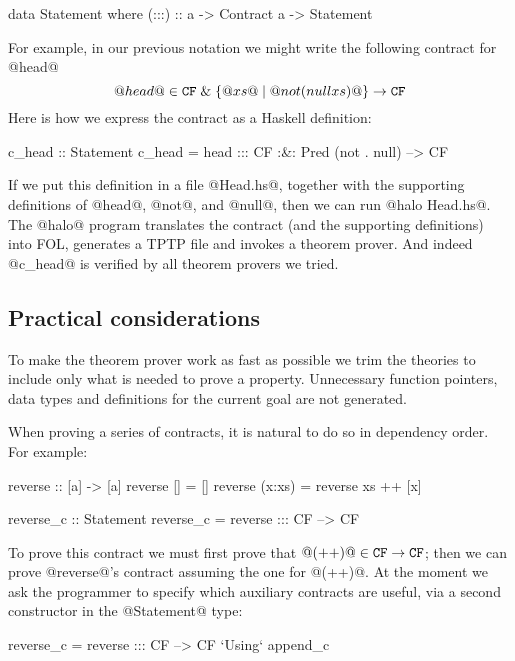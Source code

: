 \begin{code}
data Statement where
    (:::) :: a -> Contract a -> Statement
\end{code}
For example, in our previous notation we might write the following
contract for @head@
$$
@head@ \in {\tt CF} \;\&\; \{@xs@ \mid @not (null xs)@ \} \rightarrow {\tt CF}
$$
Here is how we express the contract as a Haskell definition:
\begin{comment}
head (x:xs) = x
head []     = error "empty list"

not True = False    null [] = True
not False = True    null xs = False

f . g = \x -> f (g x)
\end{comment}
\begin{code}
c_head :: Statement
c_head = head ::: CF :&: Pred (not . null) --> CF
\end{code}
If we put this definition in a file @Head.hs@, together with the supporting
definitions of @head@, @not@, and @null@, 
then we can run @halo Head.hs@. 
The @halo@ program translates the contract (and the supporting definitions) into
FOL, generates a TPTP file and invokes a theorem prover.
And indeed @c_head@ is verified by all theorem provers we tried.

\subsection{Practical considerations}

To make the theorem prover work as fast as possible we trim the
theories to include only what is needed to prove a
property. Unnecessary function pointers, data types and definitions
for the current goal are not generated.

When proving a series of contracts, it is natural to do so in dependency order.
For example:
\begin{code}
  reverse :: [a] -> [a]
  reverse [] = []
  reverse (x:xs) = reverse xs ++ [x]

  reverse_c :: Statement
  reverse_c = reverse ::: CF --> CF
\end{code}
To prove this contract we must first prove that $@(++)@ \in {\tt CF} \rightarrow {\tt CF}$;
then we can prove @reverse@'s contract assuming the one for @(++)@.
At the moment we ask the programmer to specify which auxiliary contracts
are useful, via a second constructor in the @Statement@ type:
\begin{code}
  reverse_c = reverse ::: CF --> CF
              `Using` append_c
\end{code}

